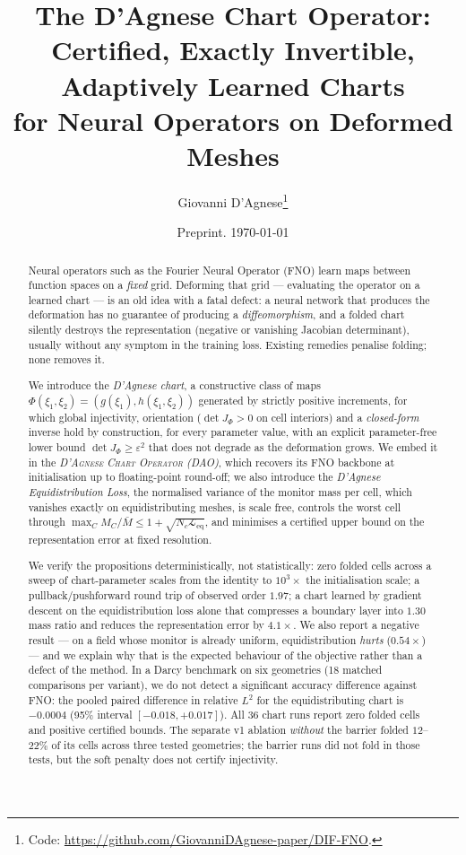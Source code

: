 \documentclass[11pt,a4paper]{article}
\title{\bfseries The D'Agnese Chart Operator:\\[2pt]
Certified, Exactly Invertible, Adaptively Learned Charts\\[2pt]
for Neural Operators on Deformed Meshes}
\author{Giovanni D'Agnese\thanks{Code: \url{https://github.com/GiovanniDAgnese-paper/DIF-FNO}.}}
\date{Preprint. \today}
\theoremstyle{plain}
\theoremstyle{definition}
\newcommand{\detJ}{\det J_\Phi}
\newcommand{\Leq}{\mathcal{L}_{\mathrm{eq}}}
\newcommand{\DAO}{\textsc{D'Agnese Chart Operator}}
\begin{document}
\maketitle

\begin{abstract}
Neural operators such as the Fourier Neural Operator (FNO) learn maps between
function spaces on a \emph{fixed} grid.  Deforming that grid — evaluating the
operator on a learned chart — is an old idea with a fatal defect: a neural
network that produces the deformation has no guarantee of producing a
\emph{diffeomorphism}, and a folded chart silently destroys the representation
(negative or vanishing Jacobian determinant), usually without any symptom in the
training loss.  Existing remedies penalise folding; none removes it.

We introduce the \emph{D'Agnese chart}, a constructive class of maps
$\Phi(\xi_1,\xi_2)=(g(\xi_1),h(\xi_1,\xi_2))$ generated by strictly positive
increments, for which global injectivity, orientation ($\detJ>0$ on cell interiors) and
a \emph{closed-form} inverse hold by construction, for every parameter value,
with an explicit parameter-free lower bound $\detJ\ge\varepsilon^2$ that does not
degrade as the deformation grows.  We embed it in the \emph{\DAO{} (DAO)}, which
recovers its FNO backbone at initialisation up to floating-point round-off;
we also introduce the \emph{D'Agnese Equidistribution Loss}, the
normalised variance of the monitor mass per cell, which vanishes exactly on
equidistributing meshes, is scale free, controls the worst cell through
$\max_C M_C/\bar M\le 1+\sqrt{N_c\Leq}$, and minimises a certified upper bound on
the representation error at fixed resolution.

We verify the propositions deterministically, not statistically: zero folded
cells across a sweep of chart-parameter scales from the identity to $10^{3}\times$
the initialisation scale; a pullback/pushforward round trip of observed order
$1.97$; a chart learned by gradient descent on the
equidistribution loss alone that compresses a boundary layer into $1.30$ mass
ratio and reduces the representation error by $4.1\times$.  We also report a
negative result — on a field whose monitor is already uniform, equidistribution
\emph{hurts} ($0.54\times$) — and we explain why that is the expected behaviour
of the objective rather than a defect of the method. In a Darcy benchmark on
six geometries (18 matched comparisons per variant), we do not detect a
significant accuracy difference against FNO: the pooled paired difference in
relative $L^2$ for the equidistributing chart is $-0.0004$ (95\% interval
$[-0.018,+0.017]$). All 36 chart runs report zero folded cells and positive
certified bounds. The separate v1 ablation \emph{without} the barrier folded
$12$--$22\%$ of its cells across three tested geometries; the barrier runs did
not fold in those tests, but the soft penalty does not certify injectivity.
\end{abstract}
\end{document}
